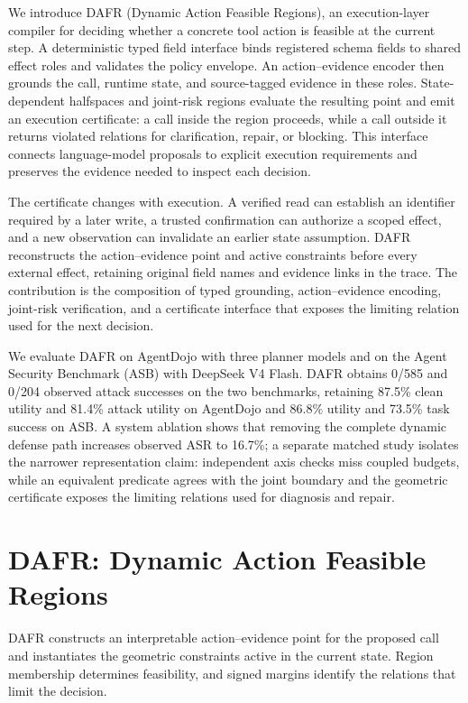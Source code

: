 \documentclass[11pt]{article}
\newcommand{\method}{\textsc{DAFR}}
\begin{document}
We introduce \method{} (Dynamic Action Feasible Regions), an execution-layer compiler for deciding whether a concrete tool action is feasible at the current step. A deterministic typed field interface binds registered schema fields to shared effect roles and validates the policy envelope. An action--evidence encoder then grounds the call, runtime state, and source-tagged evidence in these roles. State-dependent halfspaces and joint-risk regions evaluate the resulting point and emit an execution certificate: a call inside the region proceeds, while a call outside it returns violated relations for clarification, repair, or blocking. This interface connects language-model proposals to explicit execution requirements and preserves the evidence needed to inspect each decision.

The certificate changes with execution. A verified read can establish an identifier required by a later write, a trusted confirmation can authorize a scoped effect, and a new observation can invalidate an earlier state assumption. DAFR reconstructs the action--evidence point and active constraints before every external effect, retaining original field names and evidence links in the trace. The contribution is the composition of typed grounding, action--evidence encoding, joint-risk verification, and a certificate interface that exposes the limiting relation used for the next decision.

We evaluate DAFR on AgentDojo with three planner models and on the Agent Security Benchmark (ASB) with DeepSeek V4 Flash. DAFR obtains 0/585 and 0/204 observed attack successes on the two benchmarks, retaining 87.5\% clean utility and 81.4\% attack utility on AgentDojo and 86.8\% utility and 73.5\% task success on ASB. A system ablation shows that removing the complete dynamic defense path increases observed ASR to 16.7\%; a separate matched study isolates the narrower representation claim: independent axis checks miss coupled budgets, while an equivalent predicate agrees with the joint boundary and the geometric certificate exposes the limiting relations used for diagnosis and repair.

\section{DAFR: Dynamic Action Feasible Regions}

DAFR constructs an interpretable action--evidence point for the proposed call and instantiates the geometric constraints active in the current state. Region membership determines feasibility, and signed margins identify the relations that limit the decision.
\end{document}
